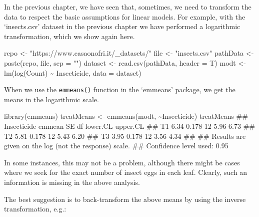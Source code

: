 \documentclass[a4paper,12pt,oneside]{book}
\newenvironment{Shaded}{\begin{snugshade}}{\end{snugshade}}
\newcommand{\SpecialCharTok}[1]{#1}
\newcommand{\StringTok}[1]{#1}
\newcommand{\DocumentationTok}[1]{#1}
\newcommand{\OtherTok}[1]{#1}
\newcommand{\FunctionTok}[1]{#1}
\newcommand{\AttributeTok}[1]{#1}
\newcommand{\NormalTok}[1]{#1}
\begin{document}
In the previous chapter, we have seen that, sometimes, we need to transform the data to respect the basic assumptions for linear models. For example, with the `insects.csv' dataset in the previous chapter we have performed a logarithmic transformation, which we show again here.

\begin{Shaded}
\begin{Highlighting}[]
\NormalTok{repo }\OtherTok{\textless{}{-}} \StringTok{"https://www.casaonofri.it/\_datasets/"}
\NormalTok{file }\OtherTok{\textless{}{-}} \StringTok{"insects.csv"}
\NormalTok{pathData }\OtherTok{\textless{}{-}} \FunctionTok{paste}\NormalTok{(repo, file, }\AttributeTok{sep =} \StringTok{""}\NormalTok{)}
\NormalTok{dataset }\OtherTok{\textless{}{-}} \FunctionTok{read.csv}\NormalTok{(pathData, }\AttributeTok{header =}\NormalTok{ T)}
\NormalTok{modt }\OtherTok{\textless{}{-}} \FunctionTok{lm}\NormalTok{(}\FunctionTok{log}\NormalTok{(Count) }\SpecialCharTok{\textasciitilde{}}\NormalTok{ Insecticide, }\AttributeTok{data =}\NormalTok{ dataset)}
\end{Highlighting}
\end{Shaded}

When we use the \texttt{emmeans()} function in the `emmeans' package, we get the means in the logarithmic scale.

\begin{Shaded}
\begin{Highlighting}[]
\FunctionTok{library}\NormalTok{(emmeans)}
\NormalTok{treatMeans }\OtherTok{\textless{}{-}} \FunctionTok{emmeans}\NormalTok{(modt, }\SpecialCharTok{\textasciitilde{}}\NormalTok{Insecticide)}
\NormalTok{treatMeans}
\DocumentationTok{\#\#  Insecticide emmean    SE df lower.CL upper.CL}
\DocumentationTok{\#\#  T1            6.34 0.178 12     5.96     6.73}
\DocumentationTok{\#\#  T2            5.81 0.178 12     5.43     6.20}
\DocumentationTok{\#\#  T3            3.95 0.178 12     3.56     4.34}
\DocumentationTok{\#\# }
\DocumentationTok{\#\# Results are given on the log (not the response) scale. }
\DocumentationTok{\#\# Confidence level used: 0.95}
\end{Highlighting}
\end{Shaded}

In some instances, this may not be a problem, although there might be cases where we seek for the exact number of insect eggs in each leaf. Clearly, such an information is missing in the above analysis.

The best suggestion is to back-transform the above means by using the inverse transformation, e.g.:
\end{document}
